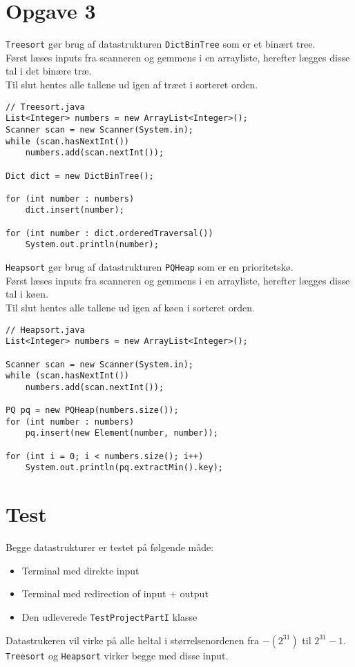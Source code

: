 \documentclass{article}
\begin{document}
\section*{Opgave 3}
\texttt{Treesort} gør brug af datastrukturen \texttt{DictBinTree} som er et binært tree.\\
Først læses inputs fra scanneren og gemmens i en arrayliste, herefter lægges disse tal i det binære træ.\\
Til slut hentes alle tallene ud igen af træet i sorteret orden.
\begin{lstlisting}
// Treesort.java
List<Integer> numbers = new ArrayList<Integer>();
Scanner scan = new Scanner(System.in);
while (scan.hasNextInt())
    numbers.add(scan.nextInt());

Dict dict = new DictBinTree();

for (int number : numbers)
    dict.insert(number);

for (int number : dict.orderedTraversal())
    System.out.println(number);
\end{lstlisting}
\texttt{Heapsort} gør brug af datastrukturen \texttt{PQHeap} som er en prioritetskø.\\
Først læses inputs fra scanneren og gemmens i en arrayliste, herefter lægges disse tal i køen.\\
Til slut hentes alle tallene ud igen af køen i sorteret orden.
\begin{lstlisting}
// Heapsort.java
List<Integer> numbers = new ArrayList<Integer>();

Scanner scan = new Scanner(System.in);
while (scan.hasNextInt())
    numbers.add(scan.nextInt());

PQ pq = new PQHeap(numbers.size());
for (int number : numbers)
    pq.insert(new Element(number, number));

for (int i = 0; i < numbers.size(); i++)
    System.out.println(pq.extractMin().key);    
\end{lstlisting}
\newpage
\section*{Test}
Begge datastrukturer er testet på følgende måde:
\begin{itemize}
  \item Terminal med direkte input
  \item Terminal med redirection of input + output  
  \item Den udleverede \texttt{TestProjectPartI} klasse
\end{itemize}
\bigskip
Datastrukeren vil virke på alle heltal i størrelsenordenen fra $-(2^{31})$ til $2^{31}-1$. \texttt{Treesort} og \texttt{Heapsort} virker begge med disse input.
\end{document}
